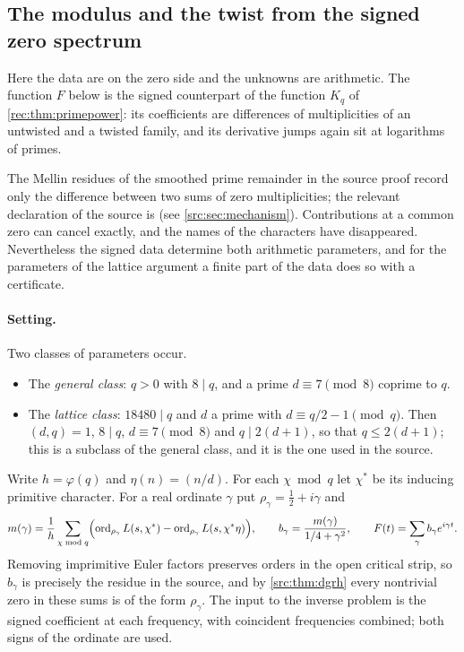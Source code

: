 \subsection{The modulus and the twist from the signed zero spectrum}\label{rec:sec:spectrum}

Here the data are on the zero side and the unknowns are arithmetic. The function $F$ below is the
signed counterpart of the function $K_q$ of \cref{rec:thm:primepower}: its coefficients are
differences of multiplicities of an untwisted and a twisted family, and its derivative jumps
again sit at logarithms of primes.

The Mellin residues of the smoothed prime remainder in the source proof record only the
difference between two sums of zero multiplicities; the relevant declaration of the source is
 (see \cref{src:sec:mechanism}). Contributions at a common zero can cancel exactly,
and the names of the characters have disappeared. Nevertheless the signed data determine both
arithmetic parameters, and for the parameters of the lattice argument a finite part of the
data does so with a certificate.

\paragraph{Setting.}
Two classes of parameters occur.
\begin{itemize}
\item The \emph{general class}: $q>0$ with $8\mid q$, and a prime $d\equiv7\pmod8$ coprime
to $q$.
\item The \emph{lattice class}: $18480\mid q$ and $d$ a prime with $d\equiv q/2-1\pmod q$.
Then $(d,q)=1$, $8\mid q$, $d\equiv7\pmod8$ and $q\mid2(d+1)$, so that $q\le2(d+1)$; this is
a subclass of the general class, and it is the one used in the source.
\end{itemize}
Write $h=\varphi(q)$ and $\eta(n)=(n/d)$. For each $\chi\bmod q$ let $\chi^*$ be its inducing
primitive character. For a real ordinate $\gamma$ put $\rho_\gamma=\tfrac12+i\gamma$ and
\begin{equation}\label{rec:eq:mgamma}
 m(\gamma)=\frac1h\sum_{\chi\bmod q}\Bigl(\operatorname{ord}_{\rho_\gamma}L(s,\chi^*)-
   \operatorname{ord}_{\rho_\gamma}L(s,\chi^*\eta)\Bigr),\qquad
 b_\gamma=\frac{m(\gamma)}{1/4+\gamma^2},\qquad
 F(t)=\sum_\gamma b_\gamma e^{i\gamma t}.
\end{equation}
Removing imprimitive Euler factors preserves orders in the open critical strip, so $b_\gamma$
is precisely the residue in the source, and by \cref{src:thm:dgrh} every nontrivial zero in
these sums is of the form $\rho_\gamma$. The input to the inverse problem is the signed
coefficient at each frequency, with coincident frequencies combined; both signs of the
ordinate are used.

